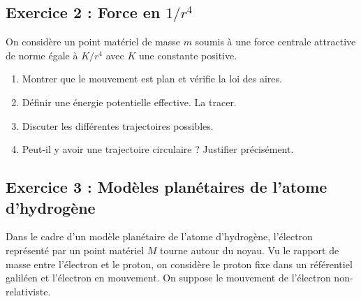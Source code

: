 \subsection{Exercice 2 : Force en $1/r^4$}

On considère un point matériel de masse $m$ soumis à une force centrale attractive de norme égale à $K/r^4$ avec $K$ une constante positive.

\begin{enumerate}
	\item Montrer que le mouvement est plan et vérifie la loi des aires.
	\item Définir une énergie potentielle effective. La tracer.
	\item Discuter les différentes trajectoires possibles.
	\item Peut-il y avoir une trajectoire circulaire ? Justifier précisément.
\end{enumerate}

\subsection{Exercice 3 : Modèles planétaires de l'atome d'hydrogène}

Dans le cadre d'un modèle planétaire de l'atome d'hydrogène, l'électron représenté par un point matériel $M$ tourne autour du noyau. Vu le rapport de masse entre l'électron et le proton, on considère le proton fixe dans un référentiel galiléen et l'électron en mouvement. On suppose le mouvement de l'électron non-relativiste.

